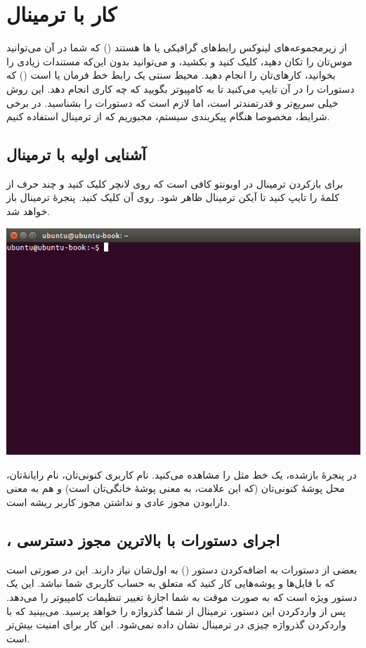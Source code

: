 \chapter{کار با ترمینال}
از زیرمجموعه‌های لینوکس رابط‌های گرافیکی یا ها هستند () که شما در آن می‌توانید موس‌تان را تکان دهید، کلیک کنید و بکشید، و می‌توانید بدون این‌که مستندات زیادی را بخوانید، کارهای‌تان را انجام دهید. محیط سنتی  یک رابط خط فرمان یا  است () که دستورات را در آن تایپ می‌کنید تا به کامپیوتر بگویید که چه کاری انجام دهد. این روش خیلی سریع‌تر و قدرتمندتر است، اما لازم است که دستورات را بشناسید. در برخی شرایط، مخصوصا هنگام پیکربندی سیستم، مجبوریم که از ترمینال استفاده کنیم.

\section{آشنایی اولیه با ترمینال}
برای بازکردن ترمینال در اوبونتو کافی است که روی لانچر کلیک کنید و چند حرف از کلمهٔ  را تایپ کنید تا آیکن ترمینال ظاهر شود. روی آن کلیک کنید. پنجرهٔ ترمینال باز خواهد شد.

\begin{center}
\includegraphics[scale=0.48]{pics/50.png}
\end{center}

در پنجرهٔ بازشده، یک خط مثل  را مشاهده می‌کنید.  نام کاربری کنونی‌تان،  نام رایانهٔ‌تان، \lr{\texttt{$\sim$}} محل پوشهٔ کنونی‌تان (که این علامت، به معنی پوشهٔ خانگی‌تان است) و \lr{\texttt{\$}} هم به معنی دارابودن مجوز عادی و نداشتن مجوز کاربر ریشه است.

\section[،sudo اجرای دستورات با بالاترین مجوز دسترسی]{، اجرای دستورات با بالاترین مجوز دسترسی}
بعضی از دستورات به اضافه‌کردن دستور  () به اول‌شان نیاز دارند. این در صورتی است که با فایل‌ها و پوشه‌هایی کار کنید که متعلق به حساب کاربری شما نباشد. این یک دستور ویژه است که به صورت موقت به شما اجازهٔ تغییر تنظیمات کامپیوتر را می‌دهد. پس از واردکردن این دستور، ترمینال از شما گذرواژه را خواهد پرسید. می‌بینید که با واردکردن گذرواژه چیزی در ترمینال نشان داده نمی‌شود. این کار برای امنیت بیش‌تر است.

